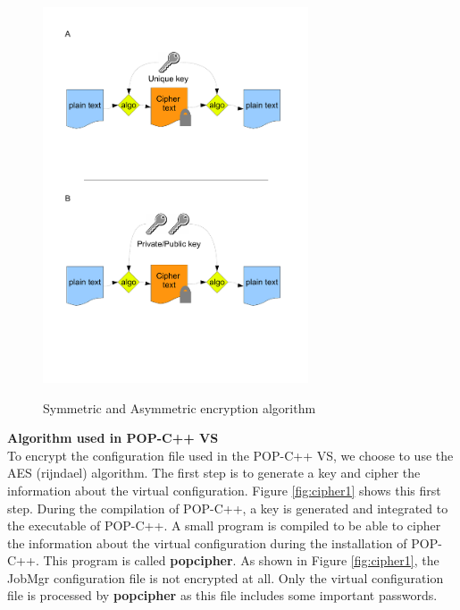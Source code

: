  \begin{figure}[ht]
	\caption{Symmetric and Asymmetric encryption algorithm}
  	\centering
	\includegraphics[width=0.7\textwidth]{./pic/encrypt_algo.pdf}
	\label{fig:asymmetric_algo}
\end{figure}

\pagebreak
\textbf{Algorithm used in POP-C++ VS}\\
To encrypt the configuration file used in the POP-C++ VS, we choose to use the AES (rijndael) algorithm. The first step is to generate a key and cipher the information about the virtual configuration. Figure \ref{fig:cipher1} shows this first step. During the compilation of POP-C++, a key is generated and integrated to the executable of POP-C++. A small program is compiled to be able to cipher the information about the virtual configuration during the installation of POP-C++. This program is called \textbf{popcipher}. As shown in Figure \ref{fig:cipher1}, the JobMgr configuration file is not encrypted at all. Only the virtual configuration file is processed by \textbf{popcipher} as this file includes some important passwords. 

